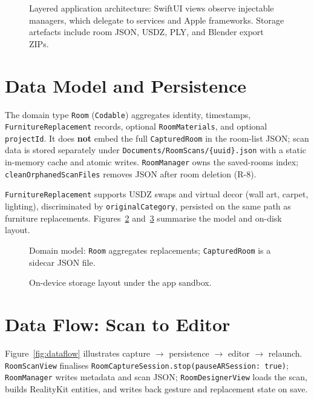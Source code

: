 \begin{figure}[htbp]
\centering
{}
\caption{Layered application architecture: SwiftUI views observe injectable managers, which delegate to services and Apple frameworks. Storage artefacts include room JSON, USDZ, PLY, and Blender export ZIPs.}
\label{fig:architecture}
\end{figure}

\section{Data Model and Persistence}
\label{sec:ch5_data_model}

The domain type \texttt{Room} (\texttt{Codable}) aggregates identity, timestamps, \texttt{FurnitureReplacement} records, optional \texttt{RoomMaterials}, and optional \texttt{projectId}. It does \textbf{not} embed the full \texttt{CapturedRoom} in the room-list JSON; scan data is stored separately under \texttt{Documents/RoomScans/\{uuid\}.json} with a static in-memory cache and atomic writes. \texttt{RoomManager} owns the saved-rooms index; \texttt{cleanOrphanedScanFiles} removes JSON after room deletion (R-8).

\texttt{FurnitureReplacement} supports USDZ swaps and virtual decor (wall art, carpet, lighting), discriminated by \texttt{originalCategory}, persisted on the same path as furniture replacements. Figures~\ref{fig:domain_model} and~\ref{fig:storage_layout} summarise the model and on-disk layout.

\begin{figure}[htbp]
\centering
{}
\caption{Domain model: \texttt{Room} aggregates replacements; \texttt{CapturedRoom} is a sidecar JSON file.}
\label{fig:domain_model}
\end{figure}

\begin{figure}[htbp]
\centering
{}
\caption{On-device storage layout under the app sandbox.}
\label{fig:storage_layout}
\end{figure}

\section{Data Flow: Scan to Editor}

Figure~\ref{fig:dataflow} illustrates capture $\rightarrow$ persistence $\rightarrow$ editor $\rightarrow$ relaunch. \texttt{RoomScanView} finalises \texttt{RoomCaptureSession.stop(pauseARSession: true)}; \texttt{RoomManager} writes metadata and scan JSON; \texttt{RoomDesignerView} loads the scan, builds RealityKit entities, and writes back gesture and replacement state on save.

